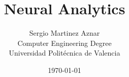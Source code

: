 \documentclass[a4paper,12pt]{report} %
\begin{document}
\title{\textbf{Neural Analytics}}               %
\author{Sergio Martinez Aznar \\ Computer Engineering Degree \\ Universidad Politécnica de Valencia}
\date{\today}
\maketitle
\newpage










\end{document}
